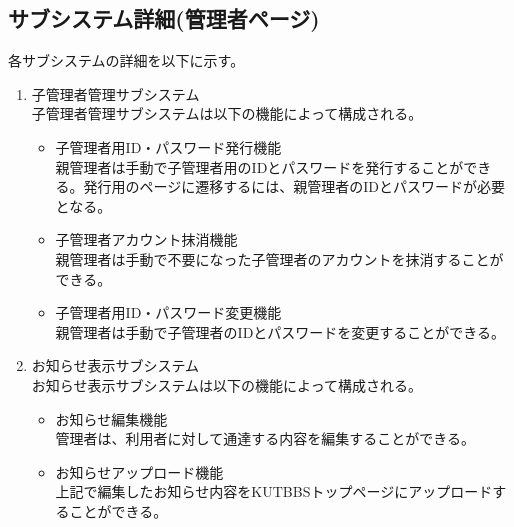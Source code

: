 \documentclass[a4j]{jarticle}
\begin{document}
\subsection{サブシステム詳細(管理者ページ)}
各サブシステムの詳細を以下に示す。
\begin{enumerate}
  \item 子管理者管理サブシステム\\
  子管理者管理サブシステムは以下の機能によって構成される。
  \begin{itemize}
    \item 子管理者用ID・パスワード発行機能\\
    親管理者は手動で子管理者用のIDとパスワードを発行することができる。発行用のページに遷移するには、親管理者のIDとパスワードが必要となる。
    \item 子管理者アカウント抹消機能\\
    親管理者は手動で不要になった子管理者のアカウントを抹消することができる。
    \item 子管理者用ID・パスワード変更機能\\
    親管理者は手動で子管理者のIDとパスワードを変更することができる。\\
  \end{itemize}

  \item お知らせ表示サブシステム\\
  お知らせ表示サブシステムは以下の機能によって構成される。
  \begin{itemize}
    \item お知らせ編集機能\\
    管理者は、利用者に対して通達する内容を編集することができる。
    \item お知らせアップロード機能\\
    上記で編集したお知らせ内容をKUTBBSトップページにアップロードすることができる。\\
  \end{itemize}


\end{enumerate}
\end{document}

